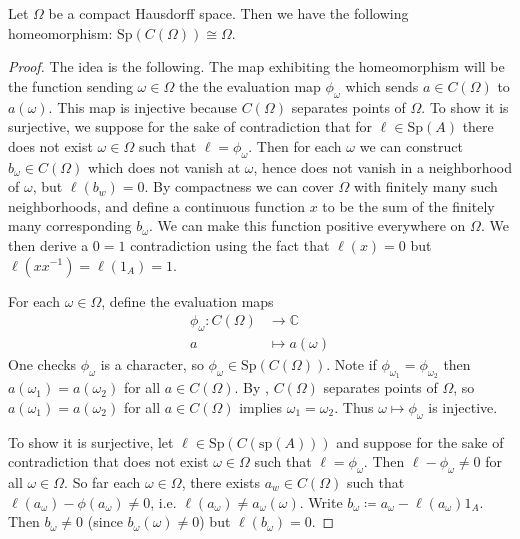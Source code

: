 \documentclass[12pt]{article}
\begin{document}
\begin{theorem}
	Let $\Omega$ be a compact Hausdorff space. Then we have the following homeomorphism: $\text{Sp}(C(\Omega)) \cong \Omega$.
\end{theorem}
\begin{proof}
	The idea is the following. The map exhibiting the homeomorphism will be the function sending $\omega\in\Omega$ the the evaluation map $\phi_\omega$ which sends $a\in C(\Omega)$ to $a(\omega)$. This map is injective because $C(\Omega)$ separates points of $\Omega$. To show it is surjective, we suppose for the sake of contradiction that for $\ell\in\text{Sp}(A)$ there does not exist $\omega\in\Omega$ such that $\ell=\phi_\omega$. Then for each $\omega$ we can construct $b_\omega\in C(\Omega)$ which does not vanish at $\omega$, hence does not vanish in a neighborhood of $\omega$, but $\ell(b_w)=0$. By compactness we can cover $\Omega$ with finitely many such neighborhoods, and define a continuous function $x$ to be the sum of the finitely many corresponding $b_\omega$. We can make this function positive everywhere on $\Omega$. We then derive a $0=1$ contradiction using the fact that $\ell(x)=0$ but $\ell(xx^{-1})=\ell(1_A)=1$. 

	For each $\omega\in\Omega$, define the evaluation maps 
	\begin{align*}
		\phi_\omega: C(\Omega) &\longrightarrow \mathbb{C} \\
		a &\mapsto a(\omega)
	\end{align*}
	One checks  $\phi_\omega$ is a character, so $\phi_\omega\in\text{Sp}(C(\Omega))$. Note if $\phi_{\omega_1}=\phi_{\omega_2}$ then $a(\omega_1)=a(\omega_2)$ for all $a\in C(\Omega)$. By , $C(\Omega)$ separates points of $\Omega$, so $a(\omega_1)=a(\omega_2)$ for all $a\in C(\Omega)$ implies $\omega_1=\omega_2$. Thus $\omega\mapsto\phi_\omega$ is injective.

	To show it is surjective, let $\ell\in \text{Sp}(C(\text{sp}(A)))$ and suppose for the sake of contradiction that does not exist $\omega\in\Omega$ such that $\ell=\phi_\omega$. Then $\ell-\phi_\omega\neq 0$ for all $\omega\in\Omega$. So far each $\omega\in\Omega$, there exists $a_w\in C(\Omega)$ such that $\ell(a_\omega) - \phi(a_\omega)\neq 0$, i.e. $\ell(a_\omega)\neq a_\omega(\omega)$. Write $b_\omega\coloneq a_\omega-\ell(a_\omega)1_A$. Then $b_\omega\neq 0$ (since $b_\omega(\omega)\neq 0$) but $\ell(b_\omega)=0$.


\end{proof}
\end{document}
